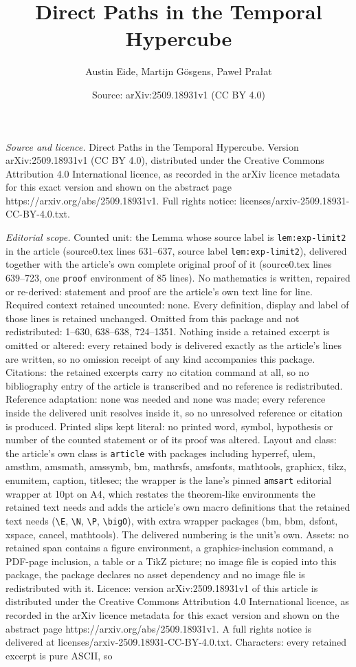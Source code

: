\documentclass[10pt,a4paper]{amsart}
\title[Direct Paths in the Temporal Hypercube]{Direct Paths in the Temporal Hypercube}
\author{Austin Eide, Martijn G\"osgens, Pawe{\l} Pra{\l}at}
\date{Source: arXiv:2509.18931v1 (CC BY 4.0)}
\begin{document}
\maketitle

\noindent\emph{Source and licence.} Direct Paths in the Temporal Hypercube. Version arXiv:2509.18931v1 (CC BY 4.0), distributed under the Creative Commons Attribution 4.0 International licence, as recorded in the arXiv licence metadata for this exact version and shown on the abstract page https://arxiv.org/abs/2509.18931v1. Full rights notice: licenses/arxiv-2509.18931-CC-BY-4.0.txt.\par\smallskip

\noindent\textit{Editorial scope.} Counted unit: the Lemma whose source label is \texttt{lem:exp-limit2} in the article (source0.tex lines 631--637, source label \texttt{lem:exp-limit2}), delivered together with the article's own complete original proof of it (source0.tex lines 639--723, one \texttt{proof} environment of 85 lines). No mathematics is written, repaired or re-derived: statement and proof are the article's own text line for line. Required context retained uncounted: none. Every definition, display and label of those lines is retained unchanged. Omitted from this package and not redistributed: 1--630, 638--638, 724--1351. Nothing inside a retained excerpt is omitted or altered: every retained body is delivered exactly as the article's lines are written, so no omission receipt of any kind accompanies this package. Citations: the retained excerpts carry no citation command at all, so no bibliography entry of the article is transcribed and no reference is redistributed. Reference adaptation: none was needed and none was made; every reference inside the delivered unit resolves inside it, so no unresolved reference or citation is produced. Printed slips kept literal: no printed word, symbol, hypothesis or number of the counted statement or of its proof was altered. Layout and class: the article's own class is \texttt{article} with packages including hyperref, ulem, amsthm, amsmath, amssymb, bm, mathrsfs, amsfonts, mathtools, graphicx, tikz, enumitem, caption, titlesec; the wrapper is the lane's pinned \texttt{amsart} editorial wrapper at 10pt on A4, which restates the theorem-like environments the retained text needs and adds the article's own macro definitions that the retained text needs (\texttt{\textbackslash E}, \texttt{\textbackslash N}, \texttt{\textbackslash P}, \texttt{\textbackslash bigO}), with extra wrapper packages (bm, bbm, dsfont, xspace, cancel, mathtools). The delivered numbering is the unit's own. Assets: no retained span contains a figure environment, a graphics-inclusion command, a PDF-page inclusion, a table or a TikZ picture; no image file is copied into this package, the package declares no asset dependency and no image file is redistributed with it. Licence: version arXiv:2509.18931v1 of this article is distributed under the Creative Commons Attribution 4.0 International licence, as recorded in the arXiv licence metadata for this exact version and shown on the abstract page https://arxiv.org/abs/2509.18931v1. A full rights notice is delivered at licenses/arxiv-2509.18931-CC-BY-4.0.txt. Characters: every retained excerpt is pure ASCII, so 
\end{document}
